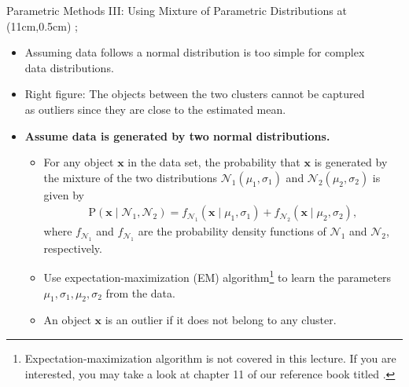 \begin{frame}{Parametric Methods III: Using Mixture of Parametric Distributions}
	\tikzoverlay at (11cm,0.5cm) {};
	\begin{itemize}
		\item Assuming data follows a normal distribution is too simple for complex\\ data distributions.
		\item Right figure: The objects between the two clusters cannot be captured\\ as outliers since they are close to the estimated mean.
		\item \textbf{Assume data is generated by {\color{airforceblue}two normal distributions.}}
		      \begin{itemize}
			      \item For any object $\mathbf{x}$ in the data set, the probability that $\mathbf{x}$ is generated by the mixture of the two distributions $\mathcal{N}_1(\mu_1, \sigma_1)$ and $\mathcal{N}_2(\mu_2, \sigma_2)$ is given by
			            \begin{align*}
				            \text{P}(\mathbf{x} \; \vert \; \mathcal{N}_1, \mathcal{N}_2) = f_{\mathcal{N}_1}(\mathbf{x} \; \vert \; \mu_1, \sigma_1) + f_{\mathcal{N}_2}(\mathbf{x} \; \vert \; \mu_2, \sigma_2),
			            \end{align*}
			            where $f_{\mathcal{N}_1}$ and $f_{\mathcal{N}_1}$ are the probability density functions of $\mathcal{N}_1$ and $\mathcal{N}_2$, respectively.
			      \item Use expectation-maximization (EM) algorithm\footnote{Expectation-maximization algorithm is not covered in this lecture. If you are interested, you may take a look at chapter 11 of our reference book titled .} to learn the parameters $\mu_1, \sigma_1, \mu_2, \sigma_2$ from the data.
			      \item An object $\mathbf{x}$ is an outlier if it does not belong to any cluster.
		      \end{itemize}
	\end{itemize}
\end{frame}


